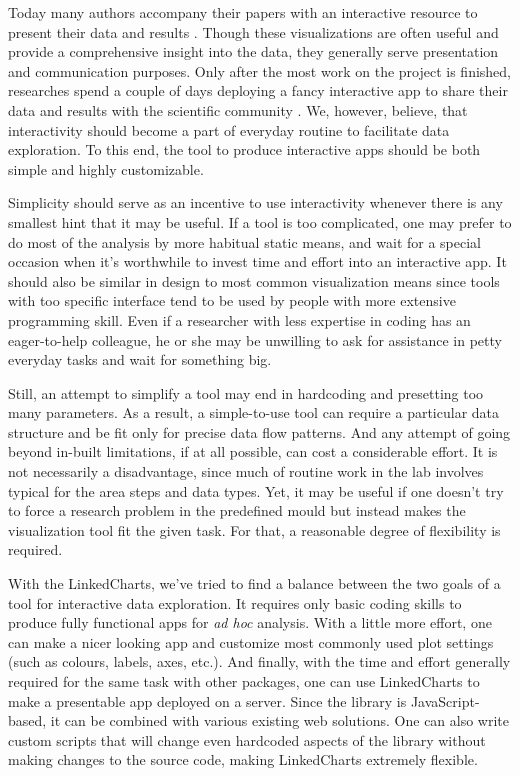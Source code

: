 \documentclass[twocolumn,10pt]{article}
\begin{document}
Today many authors accompany their papers with an interactive resource to present their data and results \citep{travaglini_2020, roider_2020, kalucka_2020}. Though these visualizations are often useful and provide a comprehensive insight into the data, they generally serve presentation and communication purposes. Only after the most work on the project is finished, researches spend a couple of days deploying a fancy interactive app to share their data and results with the scientific community \citep{batch_2017}. We, however, believe, that interactivity should become a part of everyday routine to facilitate data exploration. To this end, the tool to produce interactive apps should be both simple and highly customizable.

Simplicity should serve as an incentive to use interactivity whenever there is any smallest hint that it may be useful. If a tool is too complicated, one may prefer to do most of the analysis by more habitual static means, and wait for a special occasion when it's worthwhile to invest time and effort into an interactive app. It should also be similar in design to most common visualization means since tools with too specific interface tend to be used by people with more extensive programming skill. Even if a researcher with less expertise in coding has an eager-to-help colleague, he or she may be unwilling to ask for assistance in petty everyday tasks and wait for something big.

Still, an attempt to simplify a tool may end in hardcoding and presetting too many parameters. As a result, a simple-to-use tool can require a particular data structure and be fit only for precise data flow patterns. And any attempt of going beyond in-built limitations, if at all possible, can cost a considerable effort. It is not necessarily a disadvantage, since much of routine work in the lab involves typical for the area steps and data types. Yet, it may be useful if one doesn't try to force a research problem in the predefined mould but instead makes the visualization tool fit the given task. For that, a reasonable degree of flexibility is required.

With the LinkedCharts, we've tried to find a balance between the two goals of a tool for interactive data exploration. It requires only basic coding skills to produce fully functional apps for \emph{ad hoc} analysis. With a little more effort, one can make a nicer looking app and customize most commonly used plot settings (such as colours, labels, axes, etc.). And finally, with the time and effort generally required for the same task with other packages, one can use LinkedCharts to make a presentable app deployed on a server. Since the library is JavaScript-based, it can be combined with various existing web solutions. One can also write custom scripts that will change even hardcoded aspects of the library without making changes to the source code, making LinkedCharts extremely flexible. 
\end{document}
